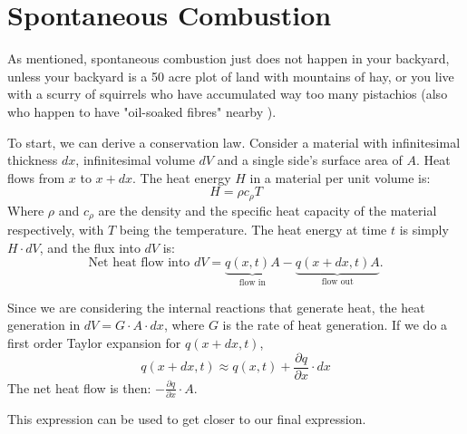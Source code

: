 \documentclass[12pt]{article}
\begin{document}
\section{Spontaneous Combustion}
As mentioned, spontaneous combustion just does not happen in your backyard, unless your backyard is a 50 acre plot of land with mountains of hay, or you live with a scurry of squirrels who have accumulated way too many pistachios (also who happen to have "oil-soaked fibres" nearby \cite{TransportInformationService}).

To start, we can derive a conservation law. Consider a material with infinitesimal thickness $dx$, infinitesimal volume $dV$ and a single side's surface area of $A$. Heat flows from $x$ to $x + dx$. The heat energy $H$ in a material per unit volume is:
\begin{equation}
    H = \rho c_\rho T
\end{equation}
Where $\rho$ and $c_\rho$ are the density and the specific heat capacity of the material respectively, with $T$ being the temperature. The heat energy at time $t$ is simply $H\cdot dV$, and the flux into $dV$ is:
\begin{equation}
    \text{Net heat flow into } dV = \underbrace{q(x, t)A}_{\text{flow in}} - \underbrace{q(x + dx, t)A}_{\text{flow out}}.
\end{equation}

Since we are considering the internal reactions that generate heat, the heat generation in $dV = G \cdot A \cdot dx$, where $G$ is the rate of heat generation. If we do a first order Taylor expansion for $q(x + dx, t)$, 
\begin{equation}
    q(x + dx, t) \approx q(x, t) + \frac{\partial q}{\partial x}\cdot dx
\end{equation}
The net heat flow is then: $- \frac{\partial q}{\partial x}\cdot A$. 

This expression can be used to get closer to our final expression.
\end{document}
